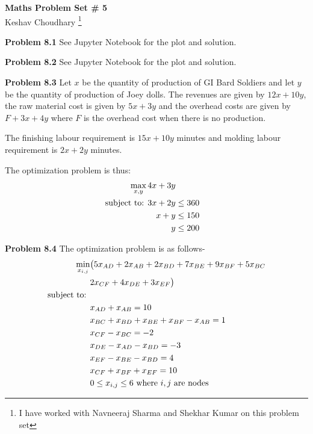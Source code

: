 \documentclass[letterpaper,12pt]{article}
\theoremstyle{definition}
\begin{document}
\begin{flushleft}
  \textbf{\large{Maths Problem Set \# 5}} \\
  Keshav Choudhary \footnote{I have worked with Navneeraj Sharma and Shekhar Kumar on this problem set}
\end{flushleft}

\vspace{5mm}

\noindent\textbf{Problem 8.1} See Jupyter Notebook for the plot and solution.

\vspace{2mm}

\noindent\textbf{Problem 8.2} See Jupyter Notebook for the plot and solution.

\vspace{2mm}

\noindent\textbf{Problem 8.3}
Let $x$ be the quantity of production of GI Bard Soldiers and let $y$ be the quantity of production of Joey dolls.
The revenues are given by $12x + 10y$, the raw material cost is given by $5x+3y$ and the overhead costs are given by
$F+3x+4y$ where $F$ is the overhead cost when there is no production.

The finishing labour requirement is $15x+10y$ minutes and molding labour requirement is $2x+2y$ minutes.

The optimization problem is thus:
\begin{align*}
  \max_{{x,y}}4x+3y\\
  \textnormal{subject to: } 3x+2y &\le 360\\
   x+y &\le 150\\
   y &\le 200
\end{align*}

\noindent\textbf{Problem 8.4}
The optimization problem is as follows-
\begin{align*}
  \min_{x_{i,j}} & \bigl( 5x_{AD} + 2x_{AB} + 2x_{BD} + 7x_{BE} + 9x_{BF} + 5x_{BC}\\
                 & 2x_{CF} + 4x_{DE}+ 3x_{EF}\bigr)\\
  \textnormal{subject to: }\\
  &x_{AD} + x_{AB} = 10\\
  &x_{BC} + x_{BD} + x_{BE} + x_{BF} - x_{AB} = 1\\
  &x_{CF} - x_{BC} = -2\\
  &x_{DE} - x_{AD} - x_{BD} = -3\\
  &x_{EF} - x_{BE} - x_{BD} = 4 \\
  &x_{CF} + x_{BF} + x_{EF} = 10\\
  & 0 \le x_{i,j} \le 6 \textnormal{ where $i,j$ are nodes}
\end{align*}
\end{document}
